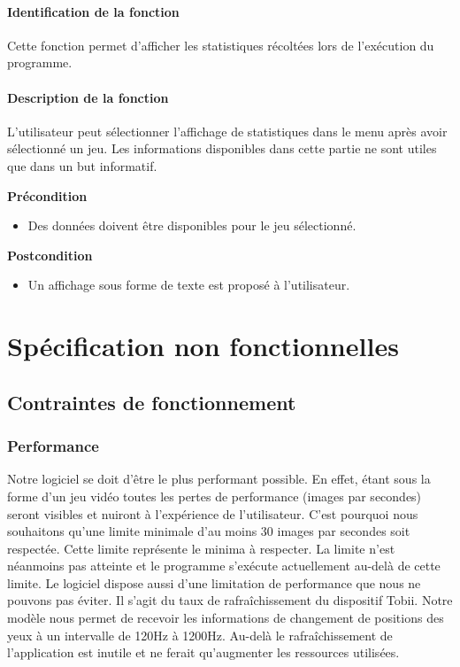 \documentclass{polytech/polytech}
\begin{document}
\paragraph{Identification de la fonction}
Cette fonction permet d'afficher les statistiques récoltées lors de l'exécution du programme.
\paragraph{Description de la fonction}
L'utilisateur peut sélectionner l'affichage de statistiques dans le menu après avoir sélectionné un jeu. Les informations disponibles dans cette partie ne sont utiles que dans un but informatif. 

\textbf{Précondition}
\begin{itemize}
\item Des données doivent être disponibles pour le jeu sélectionné.
\end{itemize}

\textbf{Postcondition}
\begin{itemize}
\item Un affichage sous forme de texte est proposé à l'utilisateur.
\end{itemize}


\section{Spécification non fonctionnelles}
\subsection{Contraintes de fonctionnement}
\subsubsection{Performance}
Notre logiciel se doit d'être le plus performant possible. En effet, étant sous la forme d'un jeu vidéo toutes les pertes de performance (images par secondes) seront visibles et nuiront à l'expérience de l'utilisateur. C'est pourquoi nous souhaitons qu'une limite minimale d'au moins 30 images par secondes soit respectée. Cette limite représente le minima à respecter. La limite n'est néanmoins pas atteinte et le programme s'exécute actuellement au-delà de cette limite.
Le logiciel dispose aussi d'une limitation de performance que nous ne pouvons pas éviter. Il s'agit du taux de rafraîchissement du dispositif Tobii. Notre modèle nous permet de recevoir les informations de changement de positions des yeux à un intervalle de 120Hz à 1200Hz. Au-delà le rafraîchissement de l'application est inutile et ne ferait qu'augmenter les ressources utilisées.
\end{document}
